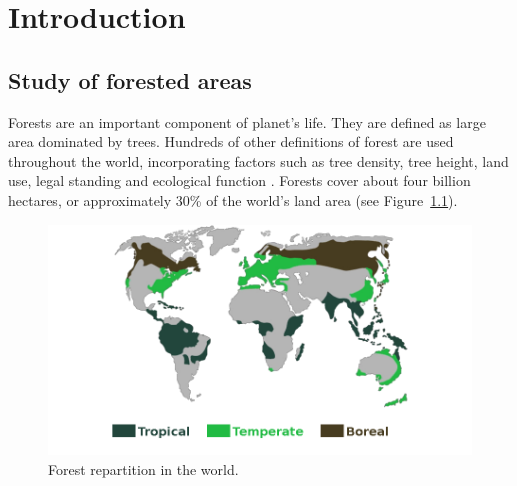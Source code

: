 
\chapter{Introduction} %
\label{Introduction} %


\startcontents[chapters]
\Mprintcontents





\section{Study of forested areas}
Forests are an important component of planet's life. They are defined as large area dominated by trees. Hundreds of other definitions of forest are used throughout the world, incorporating factors such as tree density, tree height, land use, legal standing and ecological function \citep{schuck2002compilation,achard2009vital}. Forests cover about four billion hectares, or approximately 30\% of the world's land area (see Figure~\ref{fig:forest_in_world}).

\begin{figure}[htbp]
\begin{center}
\includegraphics[width=\textwidth]{Figures/forest_in_world}
\caption{Forest repartition in the world.}
\label{fig:forest_in_world}
\end{center}
\end{figure}

